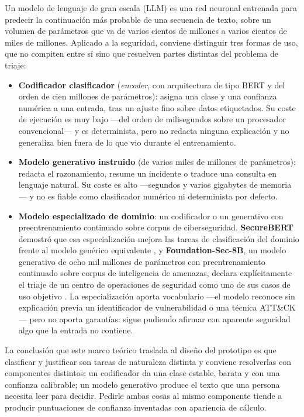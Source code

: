 Un modelo de lenguaje de gran escala (LLM) es una red neuronal entrenada para predecir la
continuación más probable de una secuencia de texto, sobre un volumen de parámetros que va de
varios cientos de millones a varios cientos de miles de millones. Aplicado a la seguridad, conviene
distinguir tres formas de uso, que no compiten entre sí sino que resuelven partes distintas del
problema de triaje:

\begin{itemize}
  \item \textbf{Codificador clasificador} (\emph{encoder}, con arquitectura de tipo BERT y del
        orden de cien millones de parámetros): asigna una clase y una confianza numérica a una
        entrada, tras un ajuste fino sobre datos etiquetados. Su coste de ejecución es muy bajo
        ---del orden de milisegundos sobre un procesador convencional--- y es determinista, pero no
        redacta ninguna explicación y no generaliza bien fuera de lo que vio durante el
        entrenamiento.
  \item \textbf{Modelo generativo instruido} (de varios miles de millones de parámetros): redacta
        el razonamiento, resume un incidente o traduce una consulta en lenguaje natural. Su coste es
        alto ---segundos y varios gigabytes de memoria--- y no es fiable como clasificador numérico ni
        determinista por defecto.
  \item \textbf{Modelo especializado de dominio}: un codificador o un generativo con
        preentrenamiento continuado sobre corpus de ciberseguridad. \textbf{SecureBERT} demostró que
        esa especialización mejora las tareas de clasificación del dominio frente al modelo genérico
        equivalente \cite{aghaei2022securebert}, y \textbf{Foundation-Sec-8B}, un modelo generativo
        de ocho mil millones de parámetros con preentrenamiento continuado sobre corpus de
        inteligencia de amenazas, declara explícitamente el triaje de un centro de operaciones de
        seguridad como uno de sus casos de uso objetivo \cite{foundationsec8b}. La especialización
        aporta vocabulario ---el modelo reconoce sin explicación previa un identificador de
        vulnerabilidad o una técnica ATT\&CK--- pero no aporta garantías: sigue pudiendo afirmar con
        aparente seguridad algo que la entrada no contiene.
\end{itemize}

La conclusión que este marco teórico traslada al diseño del prototipo es que clasificar y
justificar son tareas de naturaleza distinta y conviene resolverlas con componentes distintos: un
codificador da una clase estable, barata y con una confianza calibrable; un modelo generativo
produce el texto que una persona necesita leer para decidir. Pedirle ambas cosas al mismo
componente tiende a producir puntuaciones de confianza inventadas con apariencia de cálculo.


